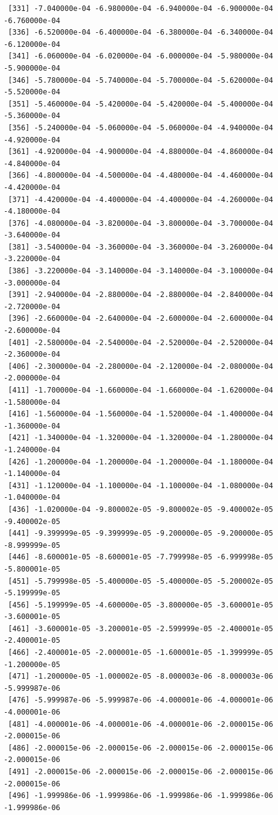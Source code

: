 \documentclass[12pt,letterpaper]{article}\usepackage[]{graphicx}\usepackage[]{color}
\begin{document}
\begin{lstlisting}
 [331] -7.040000e-04 -6.980000e-04 -6.940000e-04 -6.900000e-04 -6.760000e-04
 [336] -6.520000e-04 -6.400000e-04 -6.380000e-04 -6.340000e-04 -6.120000e-04
 [341] -6.060000e-04 -6.020000e-04 -6.000000e-04 -5.980000e-04 -5.900000e-04
 [346] -5.780000e-04 -5.740000e-04 -5.700000e-04 -5.620000e-04 -5.520000e-04
 [351] -5.460000e-04 -5.420000e-04 -5.420000e-04 -5.400000e-04 -5.360000e-04
 [356] -5.240000e-04 -5.060000e-04 -5.060000e-04 -4.940000e-04 -4.920000e-04
 [361] -4.920000e-04 -4.900000e-04 -4.880000e-04 -4.860000e-04 -4.840000e-04
 [366] -4.800000e-04 -4.500000e-04 -4.480000e-04 -4.460000e-04 -4.420000e-04
 [371] -4.420000e-04 -4.400000e-04 -4.400000e-04 -4.260000e-04 -4.180000e-04
 [376] -4.080000e-04 -3.820000e-04 -3.800000e-04 -3.700000e-04 -3.640000e-04
 [381] -3.540000e-04 -3.360000e-04 -3.360000e-04 -3.260000e-04 -3.220000e-04
 [386] -3.220000e-04 -3.140000e-04 -3.140000e-04 -3.100000e-04 -3.000000e-04
 [391] -2.940000e-04 -2.880000e-04 -2.880000e-04 -2.840000e-04 -2.720000e-04
 [396] -2.660000e-04 -2.640000e-04 -2.600000e-04 -2.600000e-04 -2.600000e-04
 [401] -2.580000e-04 -2.540000e-04 -2.520000e-04 -2.520000e-04 -2.360000e-04
 [406] -2.300000e-04 -2.280000e-04 -2.120000e-04 -2.080000e-04 -2.000000e-04
 [411] -1.700000e-04 -1.660000e-04 -1.660000e-04 -1.620000e-04 -1.580000e-04
 [416] -1.560000e-04 -1.560000e-04 -1.520000e-04 -1.400000e-04 -1.360000e-04
 [421] -1.340000e-04 -1.320000e-04 -1.320000e-04 -1.280000e-04 -1.240000e-04
 [426] -1.200000e-04 -1.200000e-04 -1.200000e-04 -1.180000e-04 -1.140000e-04
 [431] -1.120000e-04 -1.100000e-04 -1.100000e-04 -1.080000e-04 -1.040000e-04
 [436] -1.020000e-04 -9.800002e-05 -9.800002e-05 -9.400002e-05 -9.400002e-05
 [441] -9.399999e-05 -9.399999e-05 -9.200000e-05 -9.200000e-05 -8.999999e-05
 [446] -8.600001e-05 -8.600001e-05 -7.799998e-05 -6.999998e-05 -5.800001e-05
 [451] -5.799998e-05 -5.400000e-05 -5.400000e-05 -5.200002e-05 -5.199999e-05
 [456] -5.199999e-05 -4.600000e-05 -3.800000e-05 -3.600001e-05 -3.600001e-05
 [461] -3.600001e-05 -3.200001e-05 -2.599999e-05 -2.400001e-05 -2.400001e-05
 [466] -2.400001e-05 -2.000001e-05 -1.600001e-05 -1.399999e-05 -1.200000e-05
 [471] -1.200000e-05 -1.000002e-05 -8.000003e-06 -8.000003e-06 -5.999987e-06
 [476] -5.999987e-06 -5.999987e-06 -4.000001e-06 -4.000001e-06 -4.000001e-06
 [481] -4.000001e-06 -4.000001e-06 -4.000001e-06 -2.000015e-06 -2.000015e-06
 [486] -2.000015e-06 -2.000015e-06 -2.000015e-06 -2.000015e-06 -2.000015e-06
 [491] -2.000015e-06 -2.000015e-06 -2.000015e-06 -2.000015e-06 -2.000015e-06
 [496] -1.999986e-06 -1.999986e-06 -1.999986e-06 -1.999986e-06 -1.999986e-06

\end{lstlisting}
\end{document}
